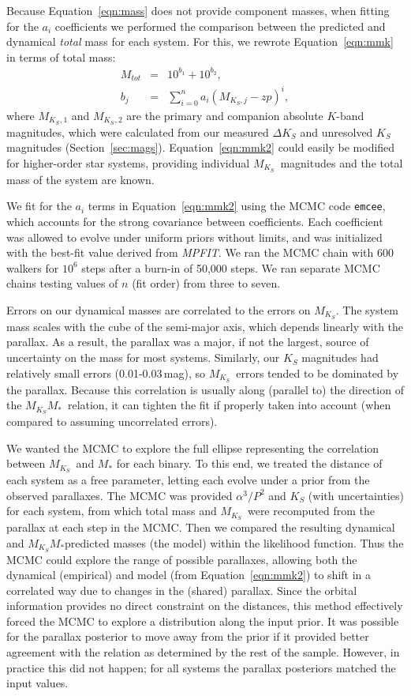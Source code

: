 \documentclass[twocolumn]{aastex62}
\newcommand{\mks}{$M_{K_S}$}
\newcommand{\mmk}{$M_{K_S}$\textendash$M_*$}
\begin{document}
Because Equation~\ref{eqn:mass} does not provide component masses, when fitting for the $a_i$ coefficients we performed the comparison between the predicted and dynamical {\it total} mass for each system. For this, we rewrote Equation~\ref{eqn:mmk} in terms of total mass:
\begin{eqnarray}\label{eqn:mmk2}
M_{tot} &=& 10^{b_1} + 10^{b_2},\\
b_j &=& \sum_{i=0}^{n} a_i(M_{K_S,j}-zp)^i, \label{eqn:mmk2_b}
\end{eqnarray}
where \mks$_{,1}$ and \mks$_{,2}$ are the primary and companion absolute $K$-band magnitudes, which were calculated from our measured $\Delta K_S$ and unresolved $K_S$ magnitudes (Section~\ref{sec:mags}). Equation~\ref{eqn:mmk2} could easily be modified for higher-order star systems, providing individual \mks\ magnitudes and the total mass of the system are known. 

We fit for the $a_i$ terms in Equation~\ref{eqn:mmk2} using the MCMC code {\tt emcee}, which accounts for the strong covariance between coefficients. Each coefficient was allowed to evolve under uniform priors without limits, and was initialized with the best-fit value derived from \textit{MPFIT}. We ran the MCMC chain with 600 walkers for $10^6$ steps after a burn-in of 50,000 steps. We ran separate MCMC chains testing values of $n$ (fit order) from three to seven. 

Errors on our dynamical masses are correlated to the errors on \mks. The system mass scales with the cube of the semi-major axis, which depends linearly with the parallax. As a result, the parallax was a major, if not the largest, source of uncertainty on the mass for most systems. Similarly, our $K_S$ magnitudes had relatively small errors (0.01-0.03\,mag), so \mks\ errors tended to be dominated by the parallax. Because this correlation is usually along (parallel to) the direction of the \mmk\ relation, it can tighten the fit if properly taken into account (when compared to assuming uncorrelated errors). 

We wanted the MCMC to explore the full ellipse representing the correlation between \mks\ and $M_*$ for each binary. To this end, we treated the distance of each system as a free parameter, letting each evolve under a prior from the observed parallaxes. The MCMC was provided $\alpha^3/P^2$ and $K_S$ (with uncertainties) for each system, from which total mass and \mks\ were recomputed from the parallax at each step in the MCMC. Then we compared the resulting dynamical and \mmk predicted masses (the model) within the likelihood function. Thus the MCMC could explore the range of possible parallaxes, allowing both the dynamical (empirical) and model (from Equation~\ref{eqn:mmk2}) to shift in a correlated way due to changes in the (shared) parallax. Since the orbital information provides no direct constraint on the distances, this method effectively forced the MCMC to explore a distribution along the input prior. It was possible for the parallax posterior to move away from the prior if it provided better agreement with the relation as determined by the rest of the sample. However, in practice this did not happen; for all systems the parallax posteriors matched the input values. 
\end{document}
